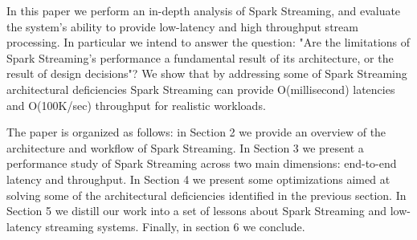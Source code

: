 
In this paper we perform an in-depth analysis of Spark Streaming, and evaluate the system's ability to provide low-latency and high throughput stream processing.
In particular we intend to answer the question: "Are the limitations of Spark Streaming's performance a fundamental result of its architecture, or the result of design decisions"?
We show that by addressing some of Spark Streaming architectural deficiencies Spark Streaming can provide O(millisecond) latencies and O(100K/sec) throughput for realistic workloads. 


The paper is organized as follows: 
in Section 2 we provide an overview of the architecture and workflow of Spark Streaming. 
In Section 3 we present a performance study of Spark Streaming across two main dimensions: end-to-end latency and throughput.
In Section 4 we present some optimizations aimed at solving some of the architectural deficiencies identified in the previous section.
In Section 5 we distill our work into a set of lessons about Spark Streaming and low-latency streaming systems.
Finally, in section 6 we conclude.


